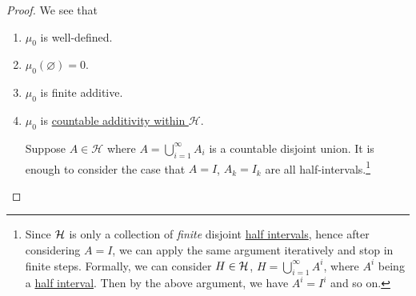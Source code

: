 \begin{proof}
	We see that
	\begin{enumerate}
		\item \(\mu _0\) is well-defined.
		\item \(\mu _0(\varnothing ) = 0\).
		\item \(\mu _0\) is finite additive.
		\item \(\mu _0\) is \hyperref[def:pre-measure-countable-additivity-within-the-algebra]{countable additivity within \(\mathcal{H}\)}.
		      \par Suppose \(A\in \mathcal{H} \) where \(A = \bigcup\limits_{i=1}^{\infty} A_{i}\) is a countable
		      disjoint union. It is enough to consider the case that \(A = I\), \(A_{k} = I_{k}\) are all
		      half-intervals.\footnote{Since \(\mathcal{\MakeUppercase{H}}\) is only a collection of \emph{finite} disjoint \hyperref[def:half-intervals]{half intervals}, hence
			      after considering \(A = I\), we can apply the same argument iteratively and stop in finite steps. Formally, we can consider \(H\in \mathcal{\MakeUppercase{H}} \),
			      \(H = \bigcup\limits_{i=1}^{\infty} A^{i}\), where \(A^i\) being a \hyperref[def:half-intervals]{half interval}. Then by the above argument, we have \(A^i = I^i\) and so on.}


\end{enumerate}
\end{proof}
